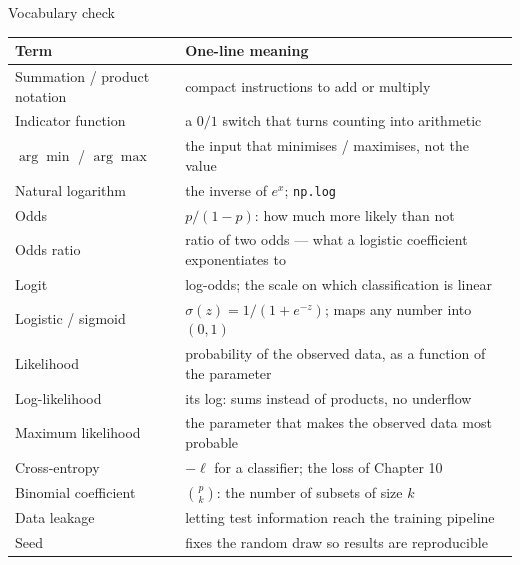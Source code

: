 \documentclass[aspectratio=169,11pt]{beamer}
\begin{document}
\begin{frame}{Vocabulary check}
  \scriptsize
  \begin{center}
  \begin{tabular}{@{}ll@{}}
    \toprule
    \textbf{Term} & \textbf{One-line meaning} \\
    \midrule
    Summation / product notation & compact instructions to add or multiply \\
    Indicator function & a $0/1$ switch that turns counting into arithmetic \\
    $\arg\min$ / $\arg\max$ & the input that minimises / maximises, not the value \\
    Natural logarithm & the inverse of $e^x$; \texttt{np.log} \\
    Odds & $p/(1-p)$: how much more likely than not \\
    Odds ratio & ratio of two odds --- what a logistic coefficient exponentiates to \\
    Logit & log-odds; the scale on which classification is linear \\
    Logistic / sigmoid & $\sigma(z) = 1/(1+e^{-z})$; maps any number into $(0,1)$ \\
    Likelihood & probability of the observed data, as a function of the parameter \\
    Log-likelihood & its log: sums instead of products, no underflow \\
    Maximum likelihood & the parameter that makes the observed data most probable \\
    Cross-entropy & $-\ell$ for a classifier; the loss of Chapter 10 \\
    Binomial coefficient & $\binom{p}{k}$: the number of subsets of size $k$ \\
    Data leakage & letting test information reach the training pipeline \\
    Seed & fixes the random draw so results are reproducible \\
    \bottomrule
  \end{tabular}
  \end{center}
\end{frame}
\end{document}
